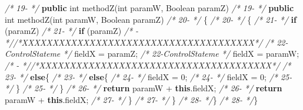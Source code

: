 \documentclass[
]{article}
\newenvironment{Shaded}{\begin{snugshade}}{\end{snugshade}}
\newcommand{\BuiltInTok}[1]{#1}
\newcommand{\CommentTok}[1]{\textcolor[rgb]{0.56,0.35,0.01}{\textit{#1}}}
\newcommand{\DataTypeTok}[1]{\textcolor[rgb]{0.13,0.29,0.53}{#1}}
\newcommand{\DecValTok}[1]{\textcolor[rgb]{0.00,0.00,0.81}{#1}}
\newcommand{\FunctionTok}[1]{\textcolor[rgb]{0.00,0.00,0.00}{#1}}
\newcommand{\KeywordTok}[1]{\textcolor[rgb]{0.13,0.29,0.53}{\textbf{#1}}}
\newcommand{\NormalTok}[1]{#1}
\begin{document}
\begin{landscape}
\begin{Shaded}
\begin{Highlighting}[]
\CommentTok{/* 19-                 */}    \KeywordTok{public} \DataTypeTok{int} \FunctionTok{methodZ}\NormalTok{(}\DataTypeTok{int}\NormalTok{ paramW, }\BuiltInTok{Boolean}\NormalTok{ paramZ)             }\CommentTok{/* 19-                 */}    \KeywordTok{public} \DataTypeTok{int} \FunctionTok{methodZ}\NormalTok{(}\DataTypeTok{int}\NormalTok{ paramW, }\BuiltInTok{Boolean}\NormalTok{ paramZ)             }
\CommentTok{/* 20-                 */}\NormalTok{    \{                                                          }\CommentTok{/* 20-                 */}\NormalTok{    \{                                                          }
\CommentTok{/* 21-                 */}        \KeywordTok{if}\NormalTok{ (paramZ)                                            }\CommentTok{/* 21-                 */}        \KeywordTok{if}\NormalTok{ (paramZ)                                            }
\CommentTok{/*   -                 *//*XXXXXXXXXXXXXXXXXXXXXXXXXXXXXXXXXXXXXX*/}                     \CommentTok{/* 22-ControlStateme   */}\NormalTok{            fieldX = paramZ;                                   }
\CommentTok{/* 22-ControlStateme   */}\NormalTok{            fieldX = paramW;                                   }\CommentTok{/*   -                 *//*XXXXXXXXXXXXXXXXXXXXXXXXXXXXXXXXXXXXXX*/}                     
\CommentTok{/* 23-                 */}        \KeywordTok{else}\NormalTok{\{                                                  }\CommentTok{/* 23-                 */}        \KeywordTok{else}\NormalTok{\{                                                  }
\CommentTok{/* 24-                 */}\NormalTok{            fieldX = }\DecValTok{0}\NormalTok{;                                        }\CommentTok{/* 24-                 */}\NormalTok{            fieldX = }\DecValTok{0}\NormalTok{;                                        }
\CommentTok{/* 25-                 */}\NormalTok{        \}                                                      }\CommentTok{/* 25-                 */}\NormalTok{        \}                                                      }
\CommentTok{/* 26-                 */}        \KeywordTok{return}\NormalTok{ paramW + }\KeywordTok{this}\NormalTok{.}\FunctionTok{fieldX}\NormalTok{;                           }\CommentTok{/* 26-                 */}        \KeywordTok{return}\NormalTok{ paramW + }\KeywordTok{this}\NormalTok{.}\FunctionTok{fieldX}\NormalTok{;                           }
\CommentTok{/* 27-                 */}\NormalTok{     \}                                                         }\CommentTok{/* 27-                 */}\NormalTok{     \}                                                         }
\CommentTok{/* 28-                 */}\NormalTok{\}                                                              }\CommentTok{/* 28-                 */}\NormalTok{\}                                                              }
\end{Highlighting}
\end{Shaded}


\end{landscape}
\end{document}
